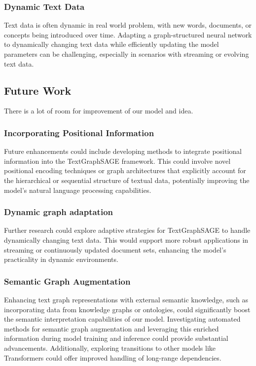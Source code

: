 \documentclass{article}
\begin{document}
\subsubsection{Dynamic Text Data}
Text data is often dynamic in real world problem, with new words, documents, or concepts being introduced over time. Adapting a graph-structured neural network to dynamically changing text data while efficiently updating the model parameters can be challenging, especially in scenarios with streaming or evolving text data.

\subsection{Future Work}
There is a lot of room for improvement of our model and idea.
\subsubsection{Incorporating Positional Information}
Future enhancements could include developing methods to integrate positional information into the TextGraphSAGE framework. This could involve novel positional encoding techniques or graph architectures that explicitly account for the hierarchical or sequential structure of textual data, potentially improving the model's natural language processing capabilities.

\subsubsection{Dynamic graph adaptation}
Further research could explore adaptive strategies for TextGraphSAGE to handle dynamically changing text data. This would support more robust applications in streaming or continuously updated document sets, enhancing the model’s practicality in dynamic environments.

\subsubsection{Semantic Graph Augmentation}
Enhancing text graph representations with external semantic knowledge, such as incorporating data from knowledge graphs or ontologies, could significantly boost the semantic interpretation capabilities of our model. Investigating automated methods for semantic graph augmentation and leveraging this enriched information during model training and inference could provide substantial advancements. Additionally, exploring transitions to other models like Transformers could offer improved handling of long-range dependencies.
\end{document}
